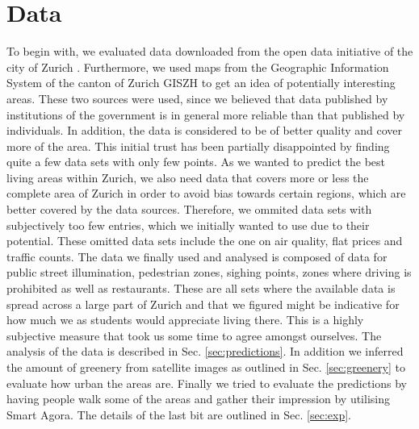 \documentclass[letterpaper]{article}
\begin{document}
\section{Data}\label{sec:data}
To begin with, we evaluated data downloaded from the open data initiative of the city of Zurich \cite{ZurichOD}. 
Furthermore, we used maps from the Geographic Information System of the canton of Zurich GISZH \cite{GISZH} to get 
an idea of potentially interesting areas.
These two sources were used, since we believed that data published by institutions of the government is in general 
more reliable than that published by individuals. In addition, the data is considered to be of better quality and 
cover more of the area. This initial trust has been partially disappointed by finding quite a few data sets with only few points.
As we wanted to predict the best living areas within Zurich, we also need data that covers more or less the complete area of Zurich
in order to avoid bias towards certain regions, which are better covered by the data sources. Therefore, we ommited data sets 
with subjectively too few entries, which we initially wanted to use due to their potential. These omitted data sets include 
the one on air quality, flat prices and traffic counts.
The data we finally used and analysed is composed of data for public street illumination, pedestrian zones, sighing points, 
zones where driving is prohibited as well as restaurants. These are all sets where the available data is spread across 
a large part of Zurich and that we figured might be indicative for how much we as students would appreciate living there. 
This is a highly subjective measure that took us some time to agree amongst ourselves.
The analysis of the data is described in Sec. \ref{sec:predictions}. In addition we inferred the amount of greenery from satellite 
images as outlined in Sec. \ref{sec:greenery} to evaluate how urban the areas are. Finally we tried to evaluate the predictions 
by having people walk some of the areas and gather their impression by utilising Smart Agora. The details of the last bit 
are outlined in Sec. \ref{sec:exp}.
\end{document}
